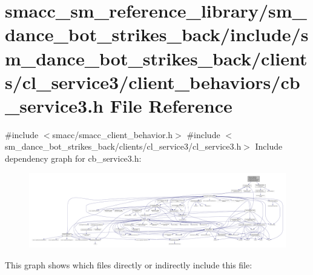 \hypertarget{sm__dance__bot__strikes__back_2include_2sm__dance__bot__strikes__back_2clients_2cl__service3_2cl02b338556f624dc0562821c4ed36e789}{}\section{smacc\+\_\+sm\+\_\+reference\+\_\+library/sm\+\_\+dance\+\_\+bot\+\_\+strikes\+\_\+back/include/sm\+\_\+dance\+\_\+bot\+\_\+strikes\+\_\+back/clients/cl\+\_\+service3/client\+\_\+behaviors/cb\+\_\+service3.h File Reference}
\label{sm__dance__bot__strikes__back_2include_2sm__dance__bot__strikes__back_2clients_2cl__service3_2cl02b338556f624dc0562821c4ed36e789}
{\ttfamily \#include $<$smacc/smacc\+\_\+client\+\_\+behavior.\+h$>$}\newline
{\ttfamily \#include $<$sm\+\_\+dance\+\_\+bot\+\_\+strikes\+\_\+back/clients/cl\+\_\+service3/cl\+\_\+service3.\+h$>$}\newline
Include dependency graph for cb\+\_\+service3.\+h\+:
\nopagebreak
\begin{figure}[H]
\begin{center}
\leavevmode
\includegraphics[width=350pt]{sm__dance__bot__strikes__back_2include_2sm__dance__bot__strikes__back_2clients_2cl__service3_2cl85aa29e2a74068fd4fc08fbe769559d4}
\end{center}
\end{figure}
This graph shows which files directly or indirectly include this file\+:
\nopagebreak
